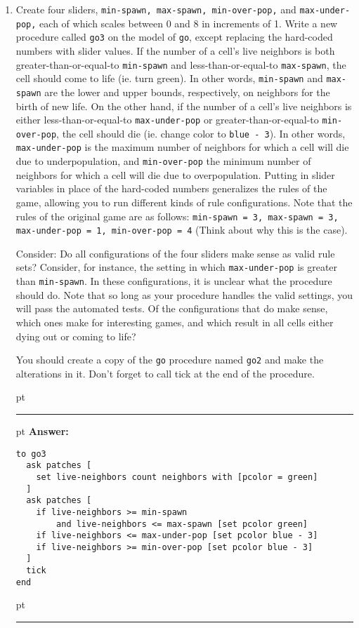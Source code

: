\documentclass[11pt]{book}
\begin{document}
\begin{enumerate}
\item Create four sliders, \texttt{min-spawn, max-spawn, min-over-pop,} and \texttt{max-under-pop,} each of which scales between 0 and 8 in increments of 1. Write a new procedure called \texttt{go3} on the model of \texttt{go}, except replacing the hard-coded numbers with slider values. If the number of a cell's live neighbors is both greater-than-or-equal-to \texttt{min-spawn} and less-than-or-equal-to \texttt{max-spawn}, the cell should come to life (ie. turn green). In other words, \texttt{min-spawn} and \texttt{max-spawn} are the lower and upper bounds, respectively, on neighbors for the birth of new life. On the other hand, if the number of a cell's live neighbors is either less-than-or-equal-to \texttt{max-under-pop} or greater-than-or-equal-to \texttt{min-over-pop}, the cell should die (ie. change color to \texttt{blue - 3}). In other words, \texttt{max-under-pop} is the maximum number of neighbors for which a cell will die due to underpopulation, and \texttt{min-over-pop} the minimum number of neighbors for which a cell will die due to overpopulation. Putting in slider variables in place of the hard-coded numbers generalizes the rules of the game, allowing you to run different kinds of rule configurations. Note that the rules of the original game are as follows: \texttt{min-spawn = 3, max-spawn = 3, max-under-pop = 1, min-over-pop = 4} (Think about why this is the case).

Consider: Do all configurations of the four sliders make sense as valid rule sets? Consider, for instance, the setting in which \texttt{max-under-pop} is greater than \texttt{min-spawn}. In these configurations, it is unclear what the procedure should do. Note that so long as your procedure handles the valid settings, you will pass the automated tests. Of the configurations that do make sense, which ones make for interesting games, and which result in all cells either dying out or coming to life?

You should create a copy of the \texttt{go} procedure named \texttt{go2} and make the alterations in it. Don't forget to call tick at the end of the procedure.

\ifnum{}
 pt
\hrule
{} pt
{\bf Answer: }
\begin{verbatim}
to go3
  ask patches [
    set live-neighbors count neighbors with [pcolor = green]
  ]
  ask patches [
    if live-neighbors >= min-spawn 
        and live-neighbors <= max-spawn [set pcolor green]
    if live-neighbors <= max-under-pop [set pcolor blue - 3]
    if live-neighbors >= min-over-pop [set pcolor blue - 3]
  ]
  tick
end
\end{verbatim}
 pt
\hrule
\fi

\end{enumerate}
\end{document}
